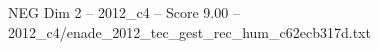 \begin{textsample}{NEG Dim 2 – 2012\_c4 – Score 9.00 – 2012\_c4/enade\_2012\_tec\_gest\_rec\_hum\_c62ecb317d.txt}
\end{textsample}
